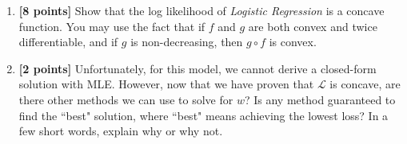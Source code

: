 \begin{enumerate}
\begin{tcolorbox}[fit,height=6cm,width=.95\textwidth,blank,borderline={1pt}{-2pt},nobeforeafter]
\end{tcolorbox}

\item \textbf{[8 points]} Show that the log likelihood of \textit{Logistic Regression} is a concave function. You may use the fact that if $f$ and $g$ are both convex and twice differentiable, and if $g$ is non-decreasing, then $g \circ f$ is convex.
    
    
\begin{tcolorbox}[fit,height=12cm,width=.95\textwidth,blank,borderline={1pt}{-2pt},nobeforeafter]

\end{tcolorbox}

\newpage

\item \textbf{[2 points]} Unfortunately, for this model, we cannot derive a closed-form solution with MLE. However, now that we have proven that $\mathcal{L}$ is concave, are there other methods we can use to solve for $w$? Is any method guaranteed to find the ``best" solution, where ``best" means achieving the lowest loss? In a few short words, explain why or why not.

\begin{tcolorbox}[fit,height=6cm,width=.95\textwidth,blank,borderline={1pt}{-2pt},nobeforeafter]

\end{tcolorbox}
  
\end{enumerate}
